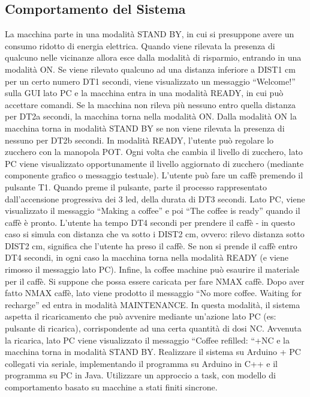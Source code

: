 \documentclass{article}
\begin{document}
\subsection{Comportamento del Sistema}

La macchina parte in una modalità STAND BY, in cui si presuppone avere un consumo ridotto di energia elettrica.  Quando viene rilevata la presenza di qualcuno nelle vicinanze allora esce dalla modalità di risparmio, entrando in una modalità ON.
\newline\newline
Se viene rilevato qualcuno  ad una distanza inferiore a DIST1 cm per un certo numero DT1 secondi, viene visualizzato un messaggio “Welcome!” sulla GUI lato PC e la macchina entra in una modalità READY, in cui può accettare comandi.  Se la macchina non rileva più nessuno entro quella distanza per DT2a secondi, la macchina torna nella modalità ON. Dalla modalità ON la macchina torna in modalità STAND BY se non viene rilevata la presenza di nessuno per DT2b secondi.
\newline\newline
In modalità READY, l’utente può regolare lo zucchero con la manopola POT. Ogni volta che cambia il livello di zucchero, lato PC viene visualizzato opportunamente il livello aggiornato di zucchero  (mediante componente grafico o messaggio testuale).
\newline\newline
L’utente può fare un caffè premendo il pulsante T1. Quando preme il pulsante, parte il processo rappresentato dall’accensione progressiva dei 3 led, della durata di DT3 secondi. Lato PC, viene visualizzato il messaggio “Making a coffee”  e poi “The coffee is ready” quando il caffè è pronto.
\newline\newline
L’utente ha tempo DT4 secondi per prendere il caffè - in questo caso si simula con distanza che va sotto i DIST2 cm, ovvero: rilevo distanza sotto DIST2 cm, significa che l’utente ha preso il caffè. Se non si prende il caffè entro DT4 secondi, in ogni caso la macchina torna nella modalità READY (e viene rimosso il messaggio lato PC).
\newline\newline
Infine, la coffee machine può esaurire il materiale per il caffè. Si suppone che possa essere caricata per fare NMAX caffè. Dopo aver fatto NMAX caffè, lato viene prodotto il messaggio “No more coffee. Waiting for recharge” ed entra in modalità MAINTENANCE.  In questa modalità, il sistema aspetta il ricaricamento che può avvenire mediante un’azione lato PC (es: pulsante di ricarica), corrispondente ad una certa quantità di dosi NC. Avvenuta la ricarica, lato PC viene visualizzato il messaggio “Coffee refilled: “+NC e la macchina torna in modalità STAND BY.
\newline\newline
Realizzare il sistema su Arduino + PC collegati via seriale, implementando il programma su Arduino in C++ e il programma su PC in Java.  Utilizzare un approccio a task, con modello di comportamento basato su macchine a stati finiti sincrone.
\end{document}
